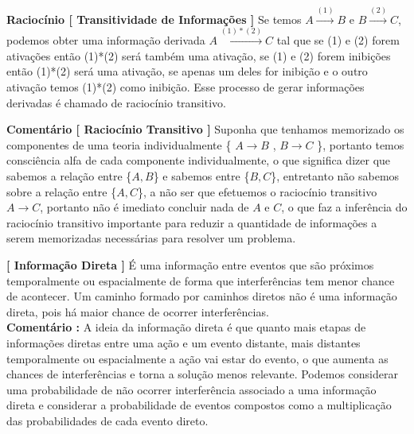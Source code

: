\documentclass[10pt,a4paper]{report}
\begin{document}
\textbf{Raciocínio [ Transitividade de Informações ]} Se temos $A \overset{(1)}{\rightarrow} B$ e $B \overset{(2)}{\rightarrow} C$, podemos obter uma informação derivada $A \overset{(1)*(2)}{\rightarrow} C$ tal que se (1) e (2) forem ativações então (1)*(2) será também uma ativação, se (1) e (2) forem inibições então (1)*(2) será uma ativação, se apenas um deles for inibição e o outro ativação temos (1)*(2) como inibição. Esse processo de gerar informações derivadas é chamado de raciocínio transitivo.

\hspace{\baselineskip}

\textbf{Comentário [ Raciocínio Transitivo ]} Suponha que tenhamos memorizado os componentes de uma teoria individualmente \{ $A \rightarrow B$ , $B \rightarrow C$ \}, portanto temos consciência alfa de cada componente individualmente, o que significa dizer que sabemos a relação entre \{$A, B$\} e sabemos entre \{$B, C$\}, entretanto não sabemos sobre a relação entre \{$A,C$\}, a não ser que efetuemos o raciocínio transitivo $A \rightarrow C$, portanto não é imediato concluir nada de $A$ e $C$, o que faz a inferência do raciocínio transitivo importante para reduzir a quantidade de informações a serem memorizadas necessárias para resolver um problema.

\hspace{\baselineskip}

\textbf{[ Informação Direta ]} É uma informação entre eventos que são próximos temporalmente ou espacialmente de forma que interferências tem menor chance de acontecer. Um caminho formado por caminhos diretos não é uma informação direta, pois há maior chance de ocorrer interferências.\\

\textbf{Comentário :} A ideia da informação direta é que quanto mais etapas de informações diretas entre uma ação e um evento distante, mais distantes temporalmente ou espacialmente a ação vai estar do evento, o que aumenta as chances de interferências e torna a solução menos relevante. Podemos considerar uma probabilidade de não ocorrer interferência associado a uma informação direta e considerar a probabilidade de eventos compostos como a multiplicação das probabilidades de cada evento direto.
\end{document}
